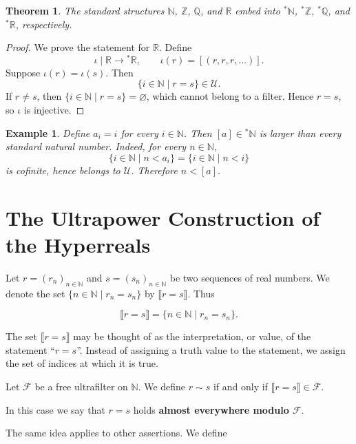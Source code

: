 \documentclass[10pt,a4paper]{book}
\let\emptyset\varnothing
\newtheorem{theorem}{Theorem}[section]
\newtheorem{example}{Example}[section]
\begin{document}
\begin{theorem}
    The standard structures $\mathbb{N}$, $\mathbb{Z}$, $\mathbb{Q}$, and $\mathbb{R}$ embed into ${}^\ast\mathbb{N}$, ${}^\ast\mathbb{Z}$, ${}^\ast\mathbb{Q}$, and ${}^\ast\mathbb{R}$, respectively.
\end{theorem}

\begin{proof}
    We prove the statement for $\mathbb{R}$. Define
    \[
        \iota \mid \mathbb{R}\to{}^\ast\mathbb{R},
        \qquad
        \iota(r)=[(r,r,r,\dots)].
    \]
    Suppose $\iota(r)=\iota(s)$. Then
    \[
        \{i\in \mathbb{N}  \mid  r=s\}\in\mathcal{U}.
    \]
    If $r\neq s$, then $\{i\in \mathbb{N}  \mid r=s\}=\emptyset$, which cannot belong to a
    filter. Hence $r=s$, so $\iota$ is injective.
\end{proof}

\begin{example}
    Define $a_i=i$ for every $i\in \mathbb{N} $. Then
    $
        [a]\in{}^\ast\mathbb{N}
    $
    is larger than every standard natural number. Indeed, for every
    $n\in\mathbb{N}$,
    \[
        \{i\in \mathbb{N}  \mid n<a_i\}
        =
        \{i\in \mathbb{N}  \mid n<i\}
    \]
    is cofinite, hence belongs to $\mathcal{U}$. Therefore
    $
        n<[a].
    $
\end{example}
\section{The Ultrapower Construction of the Hyperreals}

Let \(r=(r_n)_{n\in\mathbb N}\) and \(s=(s_n)_{n\in\mathbb N}\) be two
sequences of real numbers. We denote the set \(\{n\in\mathbb N \mid r_n=s_n\}\) by
\(\llbracket r=s\rrbracket\). Thus

$$
    \llbracket r=s\rrbracket=\{n\in\mathbb N \mid r_n=s_n\}.
$$

The set \(\llbracket r=s\rrbracket\) may be thought of as the interpretation,
or value, of the statement ``\(r=s\)''. Instead of assigning a truth value to
the statement, we assign the set of indices at which it is true.

Let \(\mathcal F\) be a free ultrafilter on \(\mathbb N\). We define \(r\sim
s\) if and only if
$
    \llbracket r=s\rrbracket\in\mathcal F.
$

In this case we say that \(r=s\) holds \textbf{almost everywhere modulo
    \(\mathcal F\)}.

The same idea applies to other assertions. We define
\end{document}
